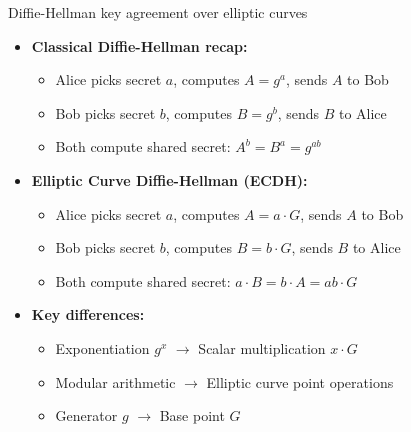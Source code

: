 \documentclass[aspectratio=169, lualatex, handout]{beamer}
\begin{document}
\begin{frame}{Diffie-Hellman key agreement over elliptic curves}
	\begin{itemize}[<+->]
		\item \textbf{Classical Diffie-Hellman recap:}
		      \begin{itemize}
			      \item Alice picks secret $a$, computes $A = g^a$, sends $A$ to Bob
			      \item Bob picks secret $b$, computes $B = g^b$, sends $B$ to Alice
			      \item Both compute shared secret: $A^b = B^a = g^{ab}$
		      \end{itemize}
		\item \textbf{Elliptic Curve Diffie-Hellman (ECDH):}
		      \begin{itemize}
			      \item Alice picks secret $a$, computes $A = a \cdot G$, sends $A$ to Bob
			      \item Bob picks secret $b$, computes $B = b \cdot G$, sends $B$ to Alice
			      \item Both compute shared secret: $a \cdot B = b \cdot A = ab \cdot G$
		      \end{itemize}
		\item \textbf{Key differences:}
		      \begin{itemize}
			      \item Exponentiation $g^x$ $\rightarrow$ Scalar multiplication $x \cdot G$
			      \item Modular arithmetic $\rightarrow$ Elliptic curve point operations
			      \item Generator $g$ $\rightarrow$ Base point $G$
		      \end{itemize}
	\end{itemize}
\end{frame}
\end{document}
